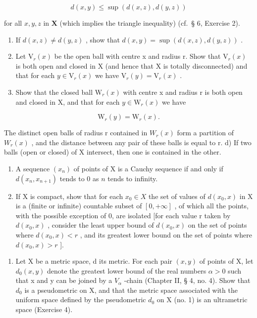 \[
d (x, y) \leqslant \sup \left(d (x, z), d (y, z)\right)
\]

for all \(x, y, z\) in \(\mathbf{X}\) (which implies the triangle inequality) (cf.~§ 6, Exercise 2).

\begin{enumerate}
\def\labelenumi{\alph{enumi})}
\item
  If \(d(x, z) \neq d(y, z)\) , show that \(d(x, y) = \sup (d(x, z), d(y, z))\) .
\item
  Let \(\mathrm{V}_{r}(x)\) be the open ball with centre x and radius r. Show that \(\mathrm{V}_{r}(x)\) is both open and closed in X (and hence that X is totally disconnected) and that for each \(y \in \mathrm{V}_{r}(x)\) we have \(\mathrm{V}_{r}(y) = \mathrm{V}_{r}(x)\) .
\item
  Show that the closed ball \(\mathrm{W}_{r}(x)\) with centre x and radius r is both open and closed in X, and that for each \(y \in \mathrm{W}_{r}(x)\) we have
\end{enumerate}

\[
\mathrm{W} _ {r} (y) = \mathrm{W} _ {r} (x).
\]

The distinct open balls of radius r contained in \(W_{r}(x)\) form a partition of \(W_{r}(x)\) , and the distance between any pair of these balls is equal to r. d) If two balls (open or closed) of X intersect, then one is contained in the other.

\begin{enumerate}
\def\labelenumi{\alph{enumi})}
\setcounter{enumi}{4}
\item
  A sequence \((x_{n})\) of points of X is a Cauchy sequence if and only if \(d(x_{n}, x_{n+1})\) tends to 0 as \(n\) tends to infinity.
\item
  If X is compact, show that for each \(x_{0} \in X\) the set of values of \(d(x_{0}, x)\) in X is a (finite or infinite) countable subset of \([0, +\infty]\) , of which all the points, with the possible exception of 0, are isolated {[}for each value r taken by \(d(x_{0}, x)\) , consider the least upper bound of \(d(x_{0}, x)\) on the set of points where \(d(x_{0}, x) < r\) , and its greatest lower bound on the set of points where \(d(x_{0}, x) > r\) {]}.
\end{enumerate}

\begin{enumerate}
\def\labelenumi{\arabic{enumi})}
\setcounter{enumi}{4}
\tightlist
\item
  Let X be a metric space, d its metric. For each pair \((x, y)\) of points of X, let \(d_{0}(x, y)\) denote the greatest lower bound of the real numbers \(\alpha > 0\) such that x and y can be joined by a \(V_{\alpha}\) -chain (Chapter II, § 4, no. 4). Show that \(d_{0}\) is a pseudometric on X, and that the metric space associated with the uniform space defined by the pseudometric \(d_{0}\) on X (no. 1) is an ultrametric space (Exercise 4).
\end{enumerate}


